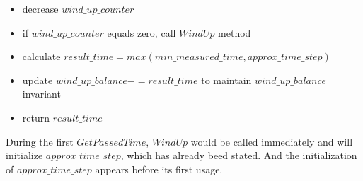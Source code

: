 \documentclass{article}
\begin{document}
\begin{itemize}
	\item decrease $wind\_up\_counter$
	\item if $wind\_up\_counter$ equals zero, call $WindUp$ method
	\item calculate $result\_time = max(min\_measured\_time, approx\_time\_step)$
	\item update $wind\_up\_balance -= result\_time$ to maintain $wind\_up\_balance$ invariant
	\item return $result\_time$
\end{itemize}
During the first $GetPassedTime$, $WindUp$ would be called immediately and will initialize $approx\_time\_step$, which has already beed stated. And the initialization of $approx\_time\_step$ appears before its first usage.
\end{document}
